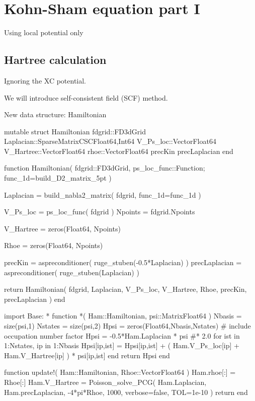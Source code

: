 \chapter{Kohn-Sham equation part I}

Using local potential only

\section{Hartree calculation}
Ignoring the XC potential.

We will introduce self-consistent field (SCF) method.

New data structure: Hamiltonian

\begin{juliacode}
mutable struct Hamiltonian
    fdgrid::FD3dGrid
    Laplacian::SparseMatrixCSC{Float64,Int64}
    V_Ps_loc::Vector{Float64}
    V_Hartree::Vector{Float64}
    rhoe::Vector{Float64}
    precKin
    precLaplacian
end
\end{juliacode}

\begin{juliacode}
function Hamiltonian( fdgrid::FD3dGrid, ps_loc_func::Function; func_1d=build_D2_matrix_5pt )
    
    Laplacian = build_nabla2_matrix( fdgrid, func_1d=func_1d )
    
    V_Ps_loc = ps_loc_func( fdgrid )
    Npoints = fdgrid.Npoints
    
    V_Hartree = zeros(Float64, Npoints)

    Rhoe = zeros(Float64, Npoints)

    precKin = aspreconditioner( ruge_stuben(-0.5*Laplacian) )
    precLaplacian = aspreconditioner( ruge_stuben(Laplacian) )
    
    return Hamiltonian( fdgrid, Laplacian, V_Ps_loc, V_Hartree, Rhoe, precKin, precLaplacian )
end
\end{juliacode}


\begin{juliacode}
import Base: *
function *( Ham::Hamiltonian, psi::Matrix{Float64} )
    Nbasis = size(psi,1)
    Nstates = size(psi,2)
    Hpsi = zeros(Float64,Nbasis,Nstates)
    # include occupation number factor
    Hpsi = -0.5*Ham.Laplacian * psi #* 2.0
    for ist in 1:Nstates, ip in 1:Nbasis
        Hpsi[ip,ist] = Hpsi[ip,ist] + ( Ham.V_Ps_loc[ip] + Ham.V_Hartree[ip] ) * psi[ip,ist]
    end
    return Hpsi
end
\end{juliacode}

\begin{juliacode}
function update!( Ham::Hamiltonian, Rhoe::Vector{Float64} )
    Ham.rhoe[:] = Rhoe[:]
    Ham.V_Hartree = Poisson_solve_PCG( Ham.Laplacian, Ham.precLaplacian, -4*pi*Rhoe, 1000, verbose=false, TOL=1e-10 )
    return
end
\end{juliacode}

